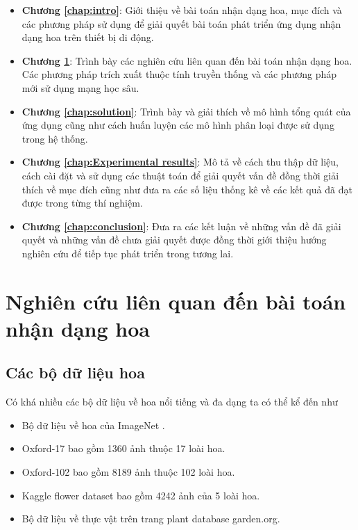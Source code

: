 \documentclass[12pt]{report}
\begin{document}
																																																						
		\begin{itemize}
			\item \textbf{Chương \ref{chap:intro}}: Giới thiệu về bài toán nhận dạng hoa, mục đích và các phương pháp sử dụng để giải quyết bài toán phát triển ứng dụng nhận dạng hoa trên thiết bị di động.
			\item \textbf{Chương \ref{chap:background}}: Trình bày các nghiên cứu liên quan đến bài toán nhận dạng hoa. Các phương pháp trích xuất thuộc tính truyền thống và các phương pháp mới sử dụng mạng học sâu.
			\item \textbf{Chương \ref{chap:solution}}: Trình bày và giải thích về mô hình tổng quát của ứng dụng cũng như cách huấn luyện các mô hình phân loại được sử dụng trong hệ thống.
			\item \textbf{Chương \ref{chap:Experimental results}}: Mô tả về cách thu thập dữ liệu, cách cài đặt và sử dụng các thuật toán để giải quyết vấn đề đồng thời giải thích về mục đích cũng như đưa ra các số liệu thống kê về các kết quả đã đạt được trong từng thí nghiệm. 
			\item \textbf{Chương \ref{chap:conclusion}}: Đưa ra các kết luận về những vấn đề đã giải quyết và những vấn đề chưa giải quyết được đồng thời giới thiệu hướng nghiên cứu để tiếp tục phát triển trong tương lai.	      
		\end{itemize}
																																																								
																																																				
																																																						
																																																						
		\newpage	
		\chapter{Nghiên cứu liên quan đến bài toán nhận dạng hoa}
		\label{chap:background}
																																																										
																																																												
		\section{Các bộ dữ liệu hoa}
		Có khá nhiều các bộ dữ liệu về hoa nổi tiếng và đa dạng ta có thể kể đến như	
		\begin{itemize}
			\item Bộ dữ liệu về hoa của ImageNet \cite{cia_imagenet}.
			\item Oxford-17 \cite{cia-Nilsback06} bao gồm 1360 ảnh thuộc 17 loài hoa.
			\item Oxford-102 \cite{cia-Nilsback06} bao gồm 8189 ảnh thuộc 102 loài hoa. 
			\item Kaggle flower dataset \cite{cia_kaggle_flower} bao gồm 4242 ảnh của 5 loài hoa.
			\item Bộ dữ liệu về thực vật trên trang plant database garden.org.
		\end{itemize}		
																																																								
\end{document}
